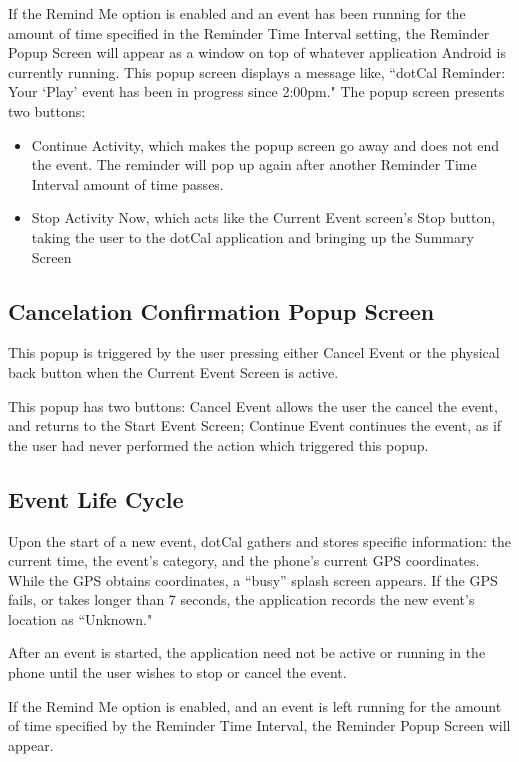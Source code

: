\documentclass[11pt]{article}
\newcommand{\bt}[1]{{\sc #1}}
\begin{document}
If the Remind Me option is enabled and an event has been running for the amount of time specified in the Reminder Time Interval setting, the Reminder Popup Screen will appear as a window on top of whatever application Android is currently running. This popup screen displays a message like, ``dotCal Reminder: Your `Play' event has been in progress since 2:00pm." The popup screen presents two buttons:
\begin{itemize}
	\item{\bt{Continue Activity}, which makes the popup screen go away and does not end the event. The reminder will pop up again after another Reminder Time Interval amount of time passes.}
	\item{\bt{Stop Activity Now}, which acts like the Current Event screen's Stop button, taking the user to the dotCal application and bringing up the Summary Screen}
\end{itemize}

\subsection{Cancelation Confirmation Popup Screen}

This popup is triggered by the user pressing either \bt{Cancel Event} or the physical back button when the Current Event Screen is active.

This popup has two buttons: \bt{Cancel Event} allows the user the cancel the event, and returns to the Start Event Screen; \bt{Continue Event} continues the event, as if the user had never performed the action which triggered this popup.

\subsection{Event Life Cycle}

Upon the start of a new event, dotCal gathers and stores specific information: the current time, the event's category, and the phone's current GPS coordinates. While the GPS obtains coordinates, a ``busy'' splash screen appears. If the GPS fails, or takes longer than 7 seconds, the application records the new event's location as ``Unknown."

After an event is started, the application need not be active or running in the phone until the user wishes to stop or cancel the event.

If the Remind Me option is enabled, and an event is left running for the amount of time specified by the Reminder Time Interval, the Reminder Popup Screen will appear.
\end{document}
